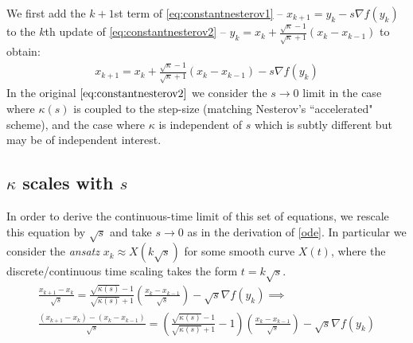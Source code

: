   We first add the $k+1$st term of \eqref{eq:constantnesterov1} -- $x_{k+1} = y_k - s \nabla f(y_k)$ to the $k$th update of \eqref{eq:constantnesterov2} -- $y_k = x_k + \frac{\sqrt{\kappa}-1}{\sqrt{\kappa}+1} (x_k - x_{k-1})$ to obtain:
 \begin{align*}
     x_{k+1} = x_{k} + \frac{\sqrt{\kappa}-1}{\sqrt{\kappa}+1}(x_{k}-x_{k-1}) - s \nabla f(y_k)
 \end{align*}
 In the original $\eqref{eq:constantnesterov2}$ we consider the $s \to 0$ limit in the case where $\kappa(s)$ is coupled to the step-size (matching Nesterov's ``accelerated" scheme), and the case where $\kappa$ is independent of $s$ which is subtly different but may be of independent interest.
 
 \subsection{$\kappa$ scales with $s$}
 
 In order to derive the continuous-time limit of this set of equations, we rescale this equation by $\sqrt{s}$ and take $s \to 0$ as in the derivation of \eqref{ode}. In particular we consider the \textit{ansatz} $x_k \approx X(k \sqrt{s})$ for some smooth curve $X(t)$, where the discrete/continuous time scaling takes the form $t = k \sqrt{s}$.
 \begin{align*}
    \frac{x_{k+1}-x_k}{\sqrt{s}} = \frac{\sqrt{\kappa(s)}-1}{\sqrt{\kappa(s)}+1} \left( \frac{x_{k}-x_{k-1}}{\sqrt{s}} \right) - \sqrt{s} \nabla f(y_k) \implies \\
    \frac{(x_{k+1}-x_k)-(x_{k}-x_{k-1})}{\sqrt{s}} = (\frac{\sqrt{\kappa(s)}-1}{\sqrt{\kappa(s)}+1}-1) \left( \frac{x_{k}-x_{k-1}}{\sqrt{s}} \right) - \sqrt{s} \nabla f(y_k)
 \end{align*}
 
